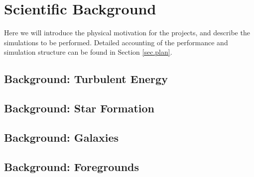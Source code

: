 \section{Scientific Background}
\label{sec.background}

Here we will introduce the physical motivation for the projects, and describe
the simulations to be performed.  Detailed accounting of the performance and
simulation structure can be found in Section \ref{sec.plan}.  


\subsection{Background: Turbulent Energy}
\label{sec.back_turb}


\subsection{Background: Star Formation}
\label{sec.back_cores}


\subsection{Background: Galaxies}
\label{sec.back_galaxies}


\subsection{Background: Foregrounds}
\label{sec.back_foregrounds}


